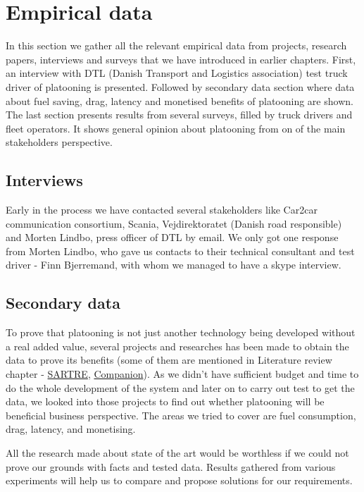 \section{Empirical data}\label{sec:data}
% 
In this section we gather all the relevant empirical data from projects, research papers, interviews and surveys that we have introduced in earlier chapters. First, an interview with DTL (Danish Transport and Logistics association) test truck driver of platooning is presented. Followed by secondary data section where data about fuel saving, drag, latency and monetised benefits of platooning are shown. The last section presents results from several surveys, filled  by truck drivers and fleet operators. It shows general opinion about platooning from on of the main stakeholders perspective.
% 
\subsection{Interviews}
% 
Early in the process we have contacted several stakeholders like Car2car communication consortium, Scania, Vejdirektoratet (Danish road responsible) and Morten Lindbo, press officer of DTL by email. We only got one response from Morten Lindbo, who gave us contacts to their technical consultant and test driver - Finn Bjerremand, with whom we managed to have a skype interview.
% 

% 
\subsection{Secondary data}
% 
To prove that platooning is not just another technology being developed without a real added value, several projects and researches has been made to obtain the data to prove its benefits (some of them are mentioned in Literature review chapter - \hyperref[sec:SARTRE]{SARTRE}, \hyperref[sec:Companion]{Companion}). As we didn't have sufficient budget and time to do the whole development of the system and later on to carry out test to get the data, we looked into those projects to find out whether platooning will be beneficial business perspective. The areas we tried to cover are fuel consumption, drag, latency, and monetising.
% 

% 

% 

% 

% 
All the research made about state of the art would be worthless if we could not prove our grounds with facts and tested data. Results gathered from various experiments will help us to compare and propose solutions for our requirements.